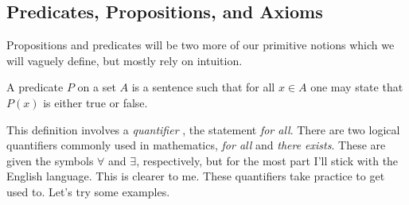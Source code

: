         \subsection{Predicates, Propositions, and Axioms}
            Propositions and predicates will be two more of our primitive
            notions which we will vaguely define, but mostly rely on intuition.
            \begin{definition}
                \label{def:Predicate}%
                A \gls{predicate} $P$ on a \gls{set} $A$ is a sentence such
                that for all $x\in{A}$ one may state that $P(x)$ is either
                true or false.
            \end{definition}
            This definition involves a \textit{quantifier}%
            , the statement
            \textit{for all}. There are two logical quantifiers commonly used
            in mathematics, \textit{for all} and \textit{there exists}. These
            are given the symbols $\forall$ and $\exists$, respectively, but
            for the most part I'll stick with the English language. This is
            clearer to me. These quantifiers take practice to get used to. Let's
            try some examples.
